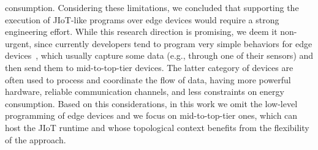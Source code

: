 consumption. Considering these limitations, we concluded that supporting the
execution of JIoT-like programs over edge devices would require a strong
engineering effort. While this research direction is promising, we deem it
non-urgent, since currently developers tend to program very simple behaviors
for edge devices~\cite{7123563}, which usually capture some data (e.g.,
through one of their sensors) and then send them to mid-to-top-tier devices.
The latter category of devices are often used to process and coordinate the
flow of data, having more powerful hardware, reliable communication channels,
and less constraints on energy consumption. Based on this considerations, in
this work we omit the low-level programming of edge devices and we focus on
mid-to-top-tier ones, which can host the JIoT runtime and whose topological
context benefits from the flexibility of the approach.

